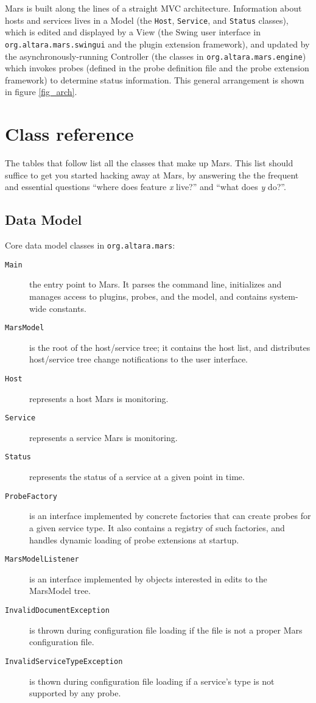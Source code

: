 \documentclass{article}
\newcommand{\identifier}[1]{{\tt #1}}
\newcommand{\openclasstable}{\begin{description}}
\newcommand{\closeclasstable}{\end{description}}
\newcommand{\classdesc}[2]{ \item[\identifier{#1}]{#2} }
\begin{document}
Mars is built along the lines of a straight MVC architecture. Information about
hosts and services lives in a Model (the \identifier{Host},
\identifier{Service}, and \identifier{Status} classes), which is edited and
displayed by a View (the Swing user interface in
\identifier{org.altara.mars.swingui} and the plugin extension framework), and
updated by the asynchronously-running Controller (the classes in
\identifier{org.altara.mars.engine}) which invokes probes (defined in the probe
definition file and the probe extension framework) to determine status
information. This general arrangement is shown in figure \ref{fig_arch}.

\section{Class reference}

The tables that follow list all the classes that make up Mars. This list
should suffice to get you started hacking away at Mars, by answering the the
frequent and essential questions ``where does feature {\sl x} live?'' and
``what does {\sl y} do?''. 

\subsection{Data Model}
Core data model classes in \identifier{org.altara.mars}:
\openclasstable
\classdesc{Main}{the entry point to Mars. It parses the command line,
initializes and manages access to plugins, probes, and the model, and contains
system-wide constants.}
\classdesc{MarsModel}{is the root of the host/service tree; it contains the
host list, and distributes host/service tree change notifications to the user
interface.}
\classdesc{Host}{represents a host Mars is monitoring.}
\classdesc{Service}{represents a service Mars is monitoring.}
\classdesc{Status}{represents the status of a service at a given point in time.}
\classdesc{ProbeFactory}{is an interface implemented by concrete factories that
can create probes for a given service type. It also contains a registry of such
factories, and handles dynamic loading of probe extensions at startup.}
\classdesc{MarsModelListener}{is an interface implemented by objects interested
in edits to the MarsModel tree.}
\classdesc{InvalidDocumentException}{is thrown during configuration file
loading if the file is not a proper Mars configuration file.}
\classdesc{InvalidServiceTypeException}{is thown during configuration file
loading if a service's type is not supported by any probe.}
\closeclasstable
\end{document}
